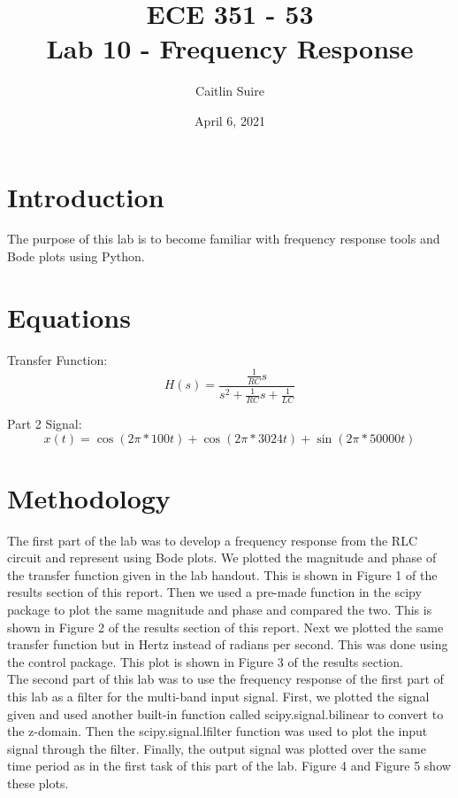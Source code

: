 \documentclass[12pt]{report}
\title{\myfont \textbf{ ECE 351 - 53 \\ \bigskip Lab 10 - Frequency Response}}
\author{Caitlin Suire}
\date{April 6, 2021}
\begin{document}
\maketitle

\thispagestyle{empty}

\newpage

\tableofcontents
\pagebreak


\section{Introduction}
The purpose of this lab is to become familiar with frequency response tools and Bode plots using Python. 

\section{Equations}
Transfer Function:
\\ \[H(s) = \frac{\frac{1}{RC}s}{s^2 + \frac{1}{RC}s + \frac{1}{LC}}\] 

\noindent Part 2 Signal:
\[x(t) = \cos(2\pi * 100t) + \cos(2\pi * 3024t) + \sin(2\pi * 50000t) \] 


\section{Methodology}
The first part of the lab was to develop a frequency response from the RLC circuit and represent using Bode plots. We plotted the magnitude and phase of the transfer function given in the lab handout. This is shown in Figure 1 of the results section of this report. Then we used a pre-made function in the scipy package to plot the same magnitude and phase and compared the two. This is shown in Figure 2 of the results section of this report. Next we plotted the same transfer function but in Hertz instead of radians per second. This was done using the control package. This plot is shown in Figure 3 of the results section. \\

\noindent  The second part of this lab was to use the frequency response of the first part of this lab as a filter for the multi-band input signal. First, we plotted the signal given and used another built-in function called scipy.signal.bilinear to convert to the z-domain. Then the scipy.signal.lfilter function was used to plot the input signal through the filter. Finally, the output signal was plotted over the same time period as in the first task of this part of the lab. Figure 4 and Figure 5 show these plots. 
\end{document}
